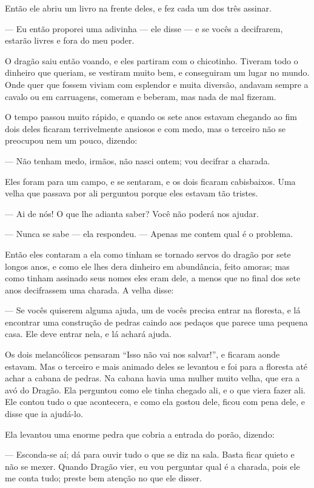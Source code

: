 Então ele abriu um livro na frente deles, e fez cada um dos três
assinar.

— Eu então proporei uma adivinha — ele disse — e se vocês a
decifrarem, estarão livres e fora do meu poder.

O dragão saiu então voando, e eles partiram com o chicotinho. Tiveram
todo o dinheiro que queriam, se vestiram muito bem, e conseguiram um
lugar no mundo. Onde quer que fossem viviam com esplendor e muita
diversão, andavam sempre a cavalo ou em carruagens, comeram e
beberam, mas nada de mal fizeram.

O tempo passou muito rápido, e quando os sete anos estavam chegando ao
fim dois deles ficaram terrivelmente ansiosos e com medo, mas o
terceiro não se preocupou nem um pouco, dizendo:

— Não tenham medo, irmãos, não nasci ontem; vou decifrar a charada.

Eles foram para um campo, e se sentaram, e os dois ficaram
cabisbaixos. Uma velha que passava por ali perguntou porque eles
estavam tão tristes.

— Ai de nós! O que lhe adianta saber? Você não poderá nos ajudar.

— Nunca se sabe — ela respondeu. — Apenas me contem qual é o problema.

Então eles contaram a ela como tinham se tornado servos do dragão por
sete longos anos, e como ele lhes dera dinheiro em abundância, feito
amoras; mas como tinham assinado seus nomes eles eram dele, a menos
que no final dos sete anos decifrassem uma charada. A velha disse:

— Se vocês quiserem alguma ajuda, um de vocês precisa entrar na
floresta, e lá encontrar uma construção de pedras caindo aos pedaços
que parece uma pequena casa. Ele deve entrar nela, e lá achará ajuda.

Os dois melancólicos pensaram “Isso não vai nos salvar!”, e ficaram
aonde estavam. Mas o terceiro e mais animado deles se levantou e foi
para a floresta até achar a cabana de pedras. Na cabana havia uma
mulher muito velha, que era a avó do Dragão. Ela perguntou como ele
tinha chegado ali, e o que viera fazer ali. Ele contou tudo o que
acontecera, e como ela gostou dele, ficou com pena dele, e disse que
ia ajudá-lo.

Ela levantou uma enorme pedra que cobria a entrada do porão, dizendo:

— Esconda-se aí; dá para ouvir tudo o que se diz na sala. Basta ficar
quieto e não se mexer. Quando Dragão vier, eu vou perguntar qual é a
charada, pois ele me conta tudo; preste bem atenção no que ele
disser.

